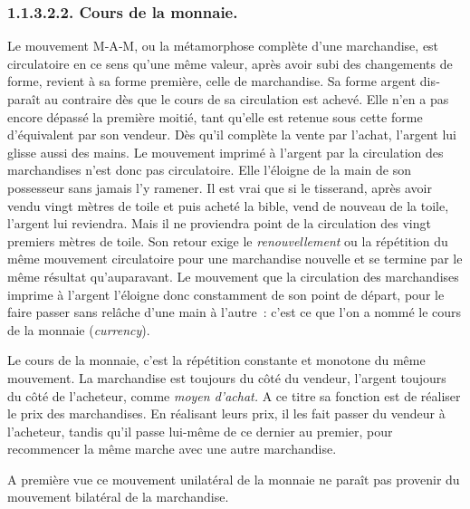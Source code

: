 \documentclass[french,twoside]{book} %
\begin{document}
\subsubsection[{1.1.3.2.2. Cours de la monnaie.}]{1.1.3.2.2. Cours de la monnaie.}
\noindent Le mouvement M‑A‑M, ou la métamorphose complète d’une marchandise, est circulatoire en ce sens qu’une même valeur, après avoir subi des changements de forme, revient à sa forme première, celle de marchandise. Sa forme argent dis­paraît au contraire dès que le cours de sa circulation est achevé. Elle n’en a pas encore dépassé la première moitié, tant qu’elle est retenue sous cette forme d’équivalent par son vendeur. Dès qu’il complète la vente par l’achat, l’argent lui glisse aussi des mains. Le mouvement imprimé à l’argent par la circulation des marchandises n’est donc pas circulatoire. Elle l’éloigne de la main de son possesseur sans jamais l’y ramener. Il est vrai que si le tisserand, après avoir vendu vingt mètres de toile et puis acheté la bible, vend de nouveau de la toile, l’argent lui reviendra. Mais il ne proviendra point de la circulation des vingt premiers mètres de toile. Son retour exige le \emph{renouvelle­ment} ou la répétition du même mouvement circulatoire pour une marchandise nouvelle et se termine par le même résultat qu’auparavant. Le mouvement que la circulation des marchan­dises imprime à l’argent l’éloigne donc constamment de son point de départ, pour le faire passer sans relâche d’une main à l’autre : c’est ce que l’on a nommé le cours de la monnaie (\emph{currency}).\par
Le cours de la monnaie, c’est la répétition constante et monotone du même mouvement. La marchandise est toujours du côté du vendeur, l’argent toujours du côté de l’acheteur, comme \emph{moyen d’achat.} A ce titre sa fonction est de réaliser le prix des marchandises. En réalisant leurs prix, il les fait passer du vendeur à l’acheteur, tandis qu’il passe lui-même de ce dernier au premier, pour recommencer la même marche avec une autre marchandise.\par
A première vue ce mouvement unilatéral de la monnaie ne paraît pas provenir du mouvement bilatéral de la marchandise.\par
\end{document}
